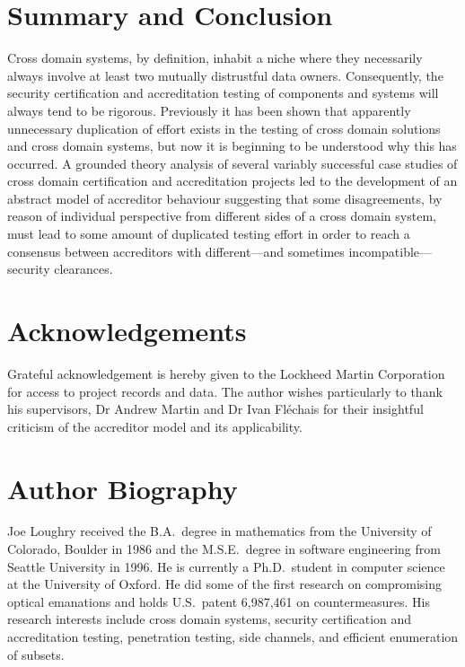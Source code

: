 \documentclass[10pt,letterpaper,conference]{IEEEtran}
\begin{document}
\section{Summary and Conclusion}

Cross domain systems, by definition, inhabit a niche where they necessarily always involve at
least two mutually distrustful data owners.  Consequently, the security certification and
accreditation testing of components and systems will always tend to be rigorous.  Previously it has
been shown that apparently unnecessary duplication of effort exists in the testing of cross domain
solutions and cross domain systems, but now it is beginning to be understood why this has occurred.
A grounded theory analysis of several variably successful case studies of cross domain
certification and accreditation projects led to the development of an abstract model of accreditor
behaviour suggesting that some disagreements, by reason of individual perspective from different
sides of a cross domain system, must lead to some amount of duplicated testing effort in order to
reach a consensus between accreditors with different---and sometimes incompatible---security
clearances.

\section{Acknowledgements}

Grateful acknowledgement is hereby given to the Lockheed Martin Corporation for access to
project records and data.  The author wishes particularly to thank his supervisors, Dr Andrew
Martin and Dr Ivan Fl\'{e}chais for their insightful criticism of the accreditor model and
its applicability.

\section{Author Biography}

Joe Loughry received the B.A.\ degree in mathematics from the University of Colorado,
Boulder in 1986 and the M.S.E.\ degree in software engineering from Seattle University
in 1996.  He is currently a Ph.D.\ student in computer science at the University of
Oxford.  He did some of the first research on compromising optical
emanations and holds U.S.\ patent 6,987,461 on countermeasures.  His research interests
include cross domain systems, security certification and accreditation testing,
penetration testing, side channels, and efficient enumeration of subsets.



\end{document}
